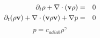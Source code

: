 \begin{eqnarray*}
    \partial_t \rho+\nabla\cdot({\bf v}\rho)&=&0
\\
    \partial_t(\rho{\bf v})+\nabla\cdot({\bf v}\rho{\bf v})+\nabla p&=&0
\end{eqnarray*}
\null
\begin{displaymath}
    p=c_{adiab}\rho^\gamma
\end{displaymath}
